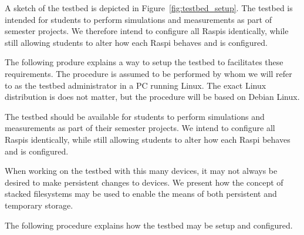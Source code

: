 A sketch of the testbed is depicted in Figure~\ref{fig:testbed_setup}.
The testbed is intended for students to perform simulations and measurements
as part of semester projects. We therefore intend to configure all
\ac{Raspi}s identically, while still allowing students to alter how each
\ac{Raspi} behaves and is configured.

The following produre explains a way to setup the testbed to facilitates these
requirements. The procedure is assumed to be performed by whom we will refer
to as the testbed administrator in a \ac{PC} running Linux. The exact Linux
distribution is does not matter, but the procedure will be based on
Debian Linux.





The testbed should be available for students to perform simulations and
measurements as part of their semester projects. We intend to configure
all \ac{Raspi}s identically, while still allowing students to alter
how each \ac{Raspi} behaves and is configured.

When working on the testbed with this many devices, it may not always be
desired to make persistent changes to devices. We present how the concept
of stacked filesystems may be used to enable the means of both persistent
and temporary storage.

%






The following procedure explains how the testbed may be setup and configured.



